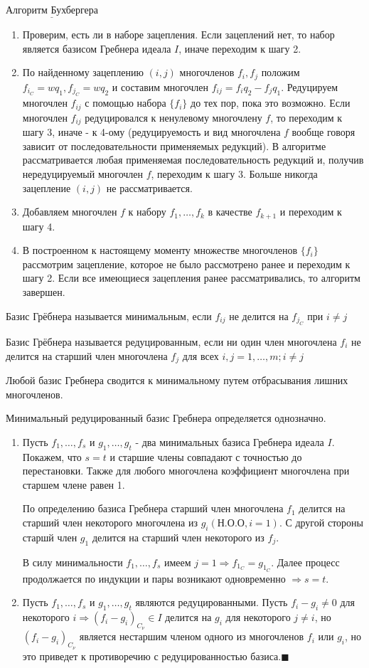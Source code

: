 $\underline{\text{Алгоритм Бухбергера}}$
\begin{enumerate}
	\item Проверим, есть ли в наборе зацепления. Если зацеплений нет, то набор является базисом Гребнера идеала $I$, иначе переходим к шагу 2.
	\item По найденному зацеплению $(i,j)$ многочленов $f_i,f_j$ положим $f_{i_C} = wq_1, f_{j_C} = wq_2$ и составим многочлен $f_{ij} = f_iq_2 - f_jq_1$. Редуцируем многочлен $f_{ij}$ с помощью набора $\{f_i\}$ до тех пор, пока это возможно. Если многочлен $f_{ij}$ редуцировался к ненулевому многочлену $f$, то переходим к шагу 3, иначе - к 4-ому (редуцируемость и вид многочлена $f$ вообще говоря зависит от последовательности применяемых редукций). В алгоритме рассматривается любая применяемая последовательность редукций и, получив нередуцируемый многочлен $f$, переходим к шагу 3. Больше никогда зацепление $(i,j)$ не рассматривается. 
	\item Добавляем многочлен $f$ к набору $f_1,\ldots,f_k$ в качестве $f_{k+1}$ и переходим к шагу 4.
	\item В построенном к настоящему моменту множестве многочленов $\{f_i\}$ рассмотрим зацепление, которое не было рассмотрено ранее и переходим к шагу 2. Если все имеющиеся зацепления ранее рассматривались, то алгоритм завершен.
\end{enumerate}

\opr Базис Грёбнера называется минимальным, если $f_{ij}$ не делится на $f_{j_C}$ при $i \neq j$

\opr Базис Грёбнера называется редуцированным, если ни один член многочлена $f_i$ не делится на старший член многочлена $f_j$ для всех $i,j = 1,\ldots,m; i \neq j$

\note Любой базис Гребнера сводится к минимальному путем отбрасывания лишних многочленов.

\thr Минимальный редуцированный базис Гребнера определяется однозначно.

\proof

\begin{enumerate}
	\item Пусть $f_1,\ldots,f_s$ и $g_1,\ldots,g_t$ - два минимальных базиса Гребнера идеала $I$. Покажем, что $s = t$ и старшие члены совпадают с точностью до перестановки. Также для любого многочлена коэффициент многочлена при старшем члене равен 1.
	
	По определению базиса Гребнера старший член многочлена $f_1$ делится на старший член некоторого многочлена из $g_i (Н.О.О, i = 1)$. С другой стороны старшй член $g_1$ делится на старший член некоторого из $f_j$. 
	
	В силу минимальности $f_1, \ldots, f_s$ имеем $j=1 \Rightarrow f_{1_C} = g_{1_C}$. Далее процесс продолжается по индукции и пары возникают одновременно $\Rightarrow s = t$.
	\item Пусть $f_1,\ldots,f_s$ и $g_1,\ldots,g_t$ являются редуцированными. Пусть $f_i - g_i \neq 0$ для некоторого $i \Rightarrow (f_i - g_i)_{C_{\nu}} \in I$ делится на $g_i$ для некоторого $j \neq i$, но $(f_i - g_i)_{C_{\nu}}$ является нестаршим членом одного из многочленов $f_i$ или $g_i$, но это приведет к противоречию с редуцированностью базиса.$\blacksquare$
\end{enumerate}
